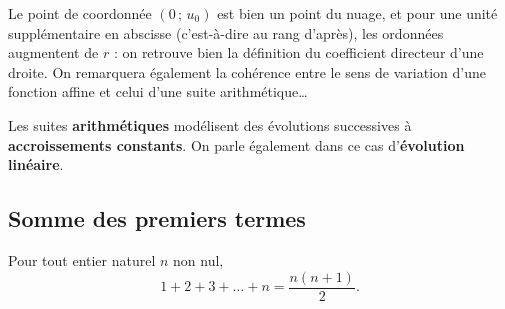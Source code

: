 \documentclass[a4paper,11pt]{article}
\begin{document}
\begin{cdemo}
Le point de coordonnée $(0\,;\,u_0)$ est bien un point du nuage, et pour une unité supplémentaire en abscisse (c'est-à-dire au rang d'après), les ordonnées augmentent de $r$ : on retrouve bien la définition du coefficient directeur d'une droite. On remarquera également la cohérence entre le sens de variation d'une fonction affine et celui d'une suite arithmétique\ldots
\end{cdemo}

\begin{cprop}
Les suites \textbf{arithmétiques} modélisent des évolutions successives à \textbf{accroissements constants}. On parle également dans ce cas d'\textbf{évolution linéaire}.
\end{cprop}

\subsection{Somme des premiers termes}

\begin{cthm}
Pour tout entier naturel $n$ non nul, \[1+2+3+ \dots + n=\frac{n(n+1)}{2}.\]
\end{cthm}
\end{document}
